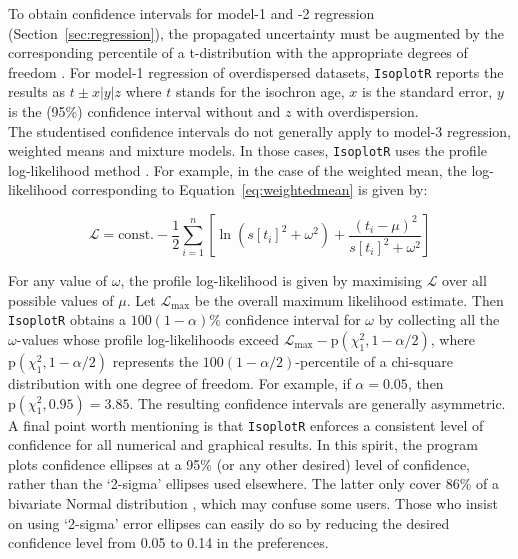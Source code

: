 \documentclass{article}
\begin{document}
To obtain confidence intervals for model-1 and -2 regression
(Section~\ref{sec:regression}), the propagated uncertainty must be
augmented by the corresponding percentile of a t-distribution with the
appropriate degrees of freedom \citep{ludwig1994}. For model-1
regression of overdispersed datasets, \texttt{IsoplotR} reports the
results as $t \pm x | y | z$ where $t$ stands for the isochron age,
$x$ is the standard error, $y$ is the (95\%) confidence interval
without and $z$ with overdispersion.\\

The studentised confidence intervals do not generally apply to model-3
regression, weighted means and mixture models. In those cases,
\texttt{IsoplotR} uses the profile log-likelihood method
\citep[][p.~200]{galbraith2005}. For example, in the case of the
weighted mean, the log-likelihood corresponding to
Equation~\ref{eq:weightedmean} is given by:

\begin{equation*}
  \mathcal{L} =
    \mbox{const.} - \frac{1}{2}
    \sum\limits_{i=1}^{n}
    \left[
    \ln(s[t_i]^2+\omega^2) +
    \frac{(t_i-\mu)^2}{s[t_i]^2+\omega^2}
    \right]
\end{equation*}

For any value of $\omega$, the profile log-likelihood is given by
maximising $\mathcal{L}$ over all possible values of $\mu$.  Let
$\mathcal{L}_\mbox{max}$ be the overall maximum likelihood estimate.
Then \texttt{IsoplotR} obtains a $100(1-\alpha)\%$ confidence interval
for $\omega$ by collecting all the $\omega$-values whose profile
log-likelihoods exceed $\mathcal{L}_{\mbox{max}} -
\mbox{p}(\chi^2_1,1-\alpha/2)$, where $\mbox{p}(\chi^2_1,1-\alpha/2)$
represents the $100(1-\alpha/2)$-percentile of a chi-square
distribution with one degree of freedom. For example, if $\alpha =
0.05$, then $\mbox{p}(\chi^2_1,0.95) = 3.85$. The resulting confidence
intervals are generally asymmetric.\\

A final point worth mentioning is that \texttt{IsoplotR} enforces a
consistent level of confidence for all numerical and graphical
results. In this spirit, the program plots confidence ellipses at a
95\% (or any other desired) level of confidence, rather than the
`2-sigma' ellipses used elsewhere. The latter only cover 86\% of a
bivariate Normal distribution \citep{horstwood2016}, which may confuse
some users.  Those who insist on using `2-sigma' error ellipses can
easily do so by reducing the desired confidence level from 0.05 to
0.14 in the preferences.
\end{document}
